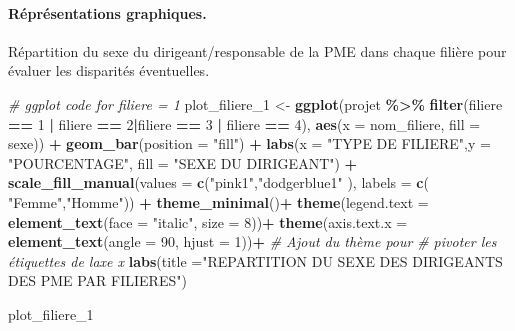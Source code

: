 \documentclass[
]{article}
\newenvironment{Shaded}{\begin{snugshade}}{\end{snugshade}}
\newcommand{\AttributeTok}[1]{\textcolor[rgb]{0.13,0.29,0.53}{#1}}
\newcommand{\CommentTok}[1]{\textcolor[rgb]{0.56,0.35,0.01}{\textit{#1}}}
\newcommand{\DecValTok}[1]{\textcolor[rgb]{0.00,0.00,0.81}{#1}}
\newcommand{\FunctionTok}[1]{\textcolor[rgb]{0.13,0.29,0.53}{\textbf{#1}}}
\newcommand{\NormalTok}[1]{#1}
\newcommand{\OtherTok}[1]{\textcolor[rgb]{0.56,0.35,0.01}{#1}}
\newcommand{\SpecialCharTok}[1]{\textcolor[rgb]{0.81,0.36,0.00}{\textbf{#1}}}
\newcommand{\StringTok}[1]{\textcolor[rgb]{0.31,0.60,0.02}{#1}}
\begin{document}
\hypertarget{ruxe9pruxe9sentations-graphiques.}{%
\paragraph{Réprésentations
graphiques.}\label{ruxe9pruxe9sentations-graphiques.}}

\hfill\break
Répartition du sexe du dirigeant/responsable de la PME dans chaque
filière pour évaluer les disparités éventuelles.

\hfill\break

\begin{Shaded}
\begin{Highlighting}[]
\CommentTok{\# ggplot code for filiere = 1}
\NormalTok{plot\_filiere\_1 }\OtherTok{\textless{}{-}} \FunctionTok{ggplot}\NormalTok{(projet }\SpecialCharTok{\%\textgreater{}\%} \FunctionTok{filter}\NormalTok{(filiere }\SpecialCharTok{==} \DecValTok{1} \SpecialCharTok{|} 
\NormalTok{                                             filiere }\SpecialCharTok{==} \DecValTok{2}\SpecialCharTok{|}\NormalTok{filiere }\SpecialCharTok{==} \DecValTok{3} \SpecialCharTok{|}
\NormalTok{                                             filiere }\SpecialCharTok{==} \DecValTok{4}\NormalTok{), }
                         \FunctionTok{aes}\NormalTok{(}\AttributeTok{x =}\NormalTok{ nom\_filiere, }\AttributeTok{fill =}\NormalTok{ sexe)) }\SpecialCharTok{+}
  \FunctionTok{geom\_bar}\NormalTok{(}\AttributeTok{position =} \StringTok{"fill"}\NormalTok{) }\SpecialCharTok{+}
  \FunctionTok{labs}\NormalTok{(}\AttributeTok{x =} \StringTok{"TYPE DE FILIERE"}\NormalTok{,}\AttributeTok{y =} \StringTok{"POURCENTAGE"}\NormalTok{, }
       \AttributeTok{fill =} \StringTok{"SEXE DU DIRIGEANT"}\NormalTok{) }\SpecialCharTok{+}
  \FunctionTok{scale\_fill\_manual}\NormalTok{(}\AttributeTok{values =} \FunctionTok{c}\NormalTok{(}\StringTok{"pink1"}\NormalTok{,}\StringTok{"dodgerblue1"}\NormalTok{ ),}
                    \AttributeTok{labels =} \FunctionTok{c}\NormalTok{( }\StringTok{"Femme"}\NormalTok{,}\StringTok{"Homme"}\NormalTok{)) }\SpecialCharTok{+}
  \FunctionTok{theme\_minimal}\NormalTok{()}\SpecialCharTok{+} 
  \FunctionTok{theme}\NormalTok{(}\AttributeTok{legend.text =} \FunctionTok{element\_text}\NormalTok{(}\AttributeTok{face =} \StringTok{"italic"}\NormalTok{, }\AttributeTok{size =} \DecValTok{8}\NormalTok{))}\SpecialCharTok{+}
  \FunctionTok{theme}\NormalTok{(}\AttributeTok{axis.text.x =} \FunctionTok{element\_text}\NormalTok{(}\AttributeTok{angle =} \DecValTok{90}\NormalTok{,}
                                   \AttributeTok{hjust =} \DecValTok{1}\NormalTok{))}\SpecialCharTok{+} \CommentTok{\# Ajout du thème pour }
                                           \CommentTok{\# pivoter les étiquettes de l\textquotesingle{}axe x}
  \FunctionTok{labs}\NormalTok{(}\AttributeTok{title =}\StringTok{"REPARTITION DU SEXE DES DIRIGEANTS DES PME PAR FILIERES"}\NormalTok{)}

\NormalTok{plot\_filiere\_1}
\end{Highlighting}
\end{Shaded}
\end{document}
